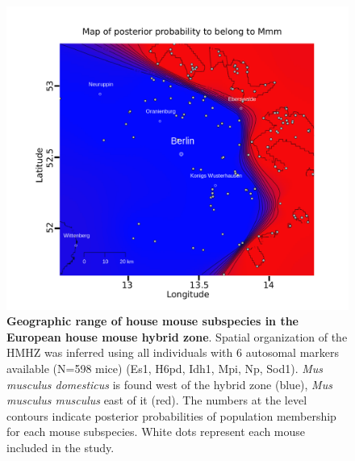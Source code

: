 \begin{figure}[H]
    \centering
    \includegraphics[width=0.9\linewidth,height=\textheight,keepaspectratio]{images/2article1/Figure1.pdf}
    \caption{\textbf{Geographic range of house mouse subspecies in the European house mouse hybrid zone}. Spatial organization of the HMHZ was inferred using all individuals with 6 autosomal markers available (N=598 mice) (Es1, H6pd, Idh1, Mpi, Np, Sod1). \textit{Mus musculus domesticus} is found west of the hybrid zone (blue), \textit{Mus musculus musculus} east of it (red). The numbers at the level contours indicate posterior probabilities of population membership for each mouse subspecies. White dots represent each mouse included in the study.}
\end{figure}

